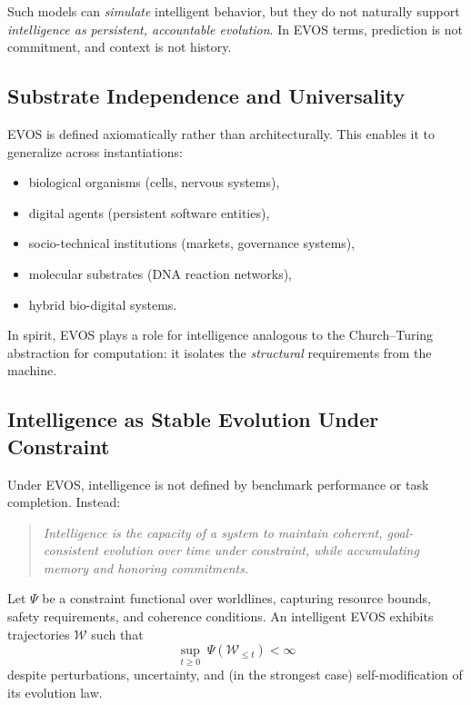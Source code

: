 \documentclass[11pt]{article}
\begin{document}
Such models can \emph{simulate} intelligent behavior, but they do not naturally support
\emph{intelligence as persistent, accountable evolution}. In EVOS terms, prediction is not
commitment, and context is not history.

\vspace{0.75em}
\subsection{Substrate Independence and Universality}

EVOS is defined axiomatically rather than architecturally. This enables it to generalize
across instantiations:
\begin{itemize}
  \item biological organisms (cells, nervous systems),
  \item digital agents (persistent software entities),
  \item socio-technical institutions (markets, governance systems),
  \item molecular substrates (DNA reaction networks),
  \item hybrid bio-digital systems.
\end{itemize}

In spirit, EVOS plays a role for intelligence analogous to the Church--Turing abstraction
for computation: it isolates the \emph{structural} requirements from the machine.

\vspace{0.75em}
\subsection{Intelligence as Stable Evolution Under Constraint}

Under EVOS, intelligence is not defined by benchmark performance or task completion.
Instead:

\begin{quote}
\emph{Intelligence is the capacity of a system to maintain coherent, goal-consistent
evolution over time under constraint, while accumulating memory and honoring commitments.}
\end{quote}

Let $\Psi$ be a constraint functional over worldlines, capturing resource bounds, safety
requirements, and coherence conditions. An intelligent EVOS exhibits trajectories
$\mathcal{W}$ such that
\[
\sup_{t \ge 0} \; \Psi(\mathcal{W}_{\le t}) < \infty
\]
despite perturbations, uncertainty, and (in the strongest case) self-modification of its
evolution law.
\end{document}
